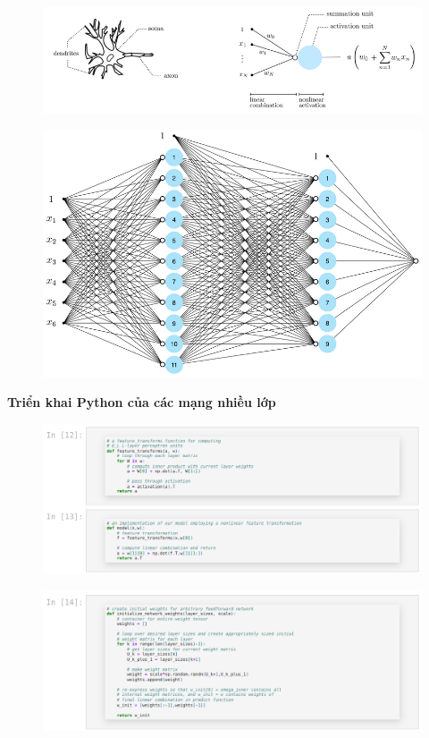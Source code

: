 \documentclass{book}
\begin{document}
    \begin{figure}[H]
        \centering
        \includegraphics[width=0.8\linewidth]{images/mau1.png}
        \label{fig:mau1}
    \end{figure}
    \begin{figure}[H]
        \centering
        \includegraphics[width=0.8\linewidth]{images/mau2.png}
        \label{fig:mau2}
    \end{figure}
    \textbf{Triển khai Python của các mạng nhiều lớp}
    \begin{figure}[H]
        \centering
        \includegraphics[width=1.0\linewidth]{images/python1.png}
        \label{fig:python1}
    \end{figure}
    \begin{figure}[H]
        \centering
        \includegraphics[width=1.0\linewidth]{images/python2.png}
        \label{fig:python2}
    \end{figure}
\end{document}
